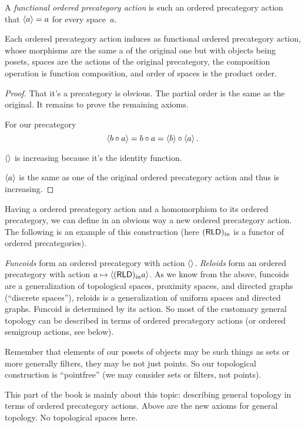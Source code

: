 \begin{defn}
A \emph{functional ordered precategory action} is such an ordered precategory action that $\left\langle a\right\rangle=a$ for every space~$a$.
\end{defn}

\begin{thm}
Each ordered precategory action induces as functional ordered precategory action, whose morphisms are the same a of the original one but with objects being posets, spaces are the actions of the original precategory, the composition operation is function composition, and order of spaces is the product order.
\end{thm}

\begin{proof}
That it's a precategory is obvious. The partial order is the same as the original. It remains to prove the remaining axioms.

For our precategory
\[ \left\langle b\circ a\right\rangle = b\circ a=\left\langle b\right\rangle\circ \left\langle a\right\rangle. \]

$\left\langle \right\rangle$ is increasing because it's the identity function.

$\left\langle a\right\rangle$ is the same as one of the original ordered precategory action and thus is increasing.
\end{proof}

Having a ordered precategory action and a homomorphism to its ordered precategory, we can define in an obvious way a new ordered precategory action. The following is an example of this construction (here $(\mathsf{RLD})_{\mathrm{in}}$ is a functor of ordered precategories).

\emph{Funcoids} form an ordered precategory with action $\left\langle \right\rangle$. \emph{Reloids} form an ordered precategory with action $a\mapsto\left\langle (\mathsf{RLD})_{\mathrm{in}} a\right\rangle$.
As we know from the above, funcoids are a generalization of topological spaces, proximity spaces, and directed graphs (``discrete spaces''), reloids is a generalization of uniform spaces and directed graphs. Funcoid is determined by its action. So most of the customary general topology can be described in terms of ordered precategory actions (or ordered semigroup actions, see below).

Remember that elements of our posets of objects may be such things as sets or more generally filters, they may be not just points. So our topological construction is ``pointfree'' (we may consider sets or filters, not points).

This part of the book is mainly about this topic: describing general topology in terms of ordered precategory actions. Above are the new axioms for general topology. No topological spaces here.


